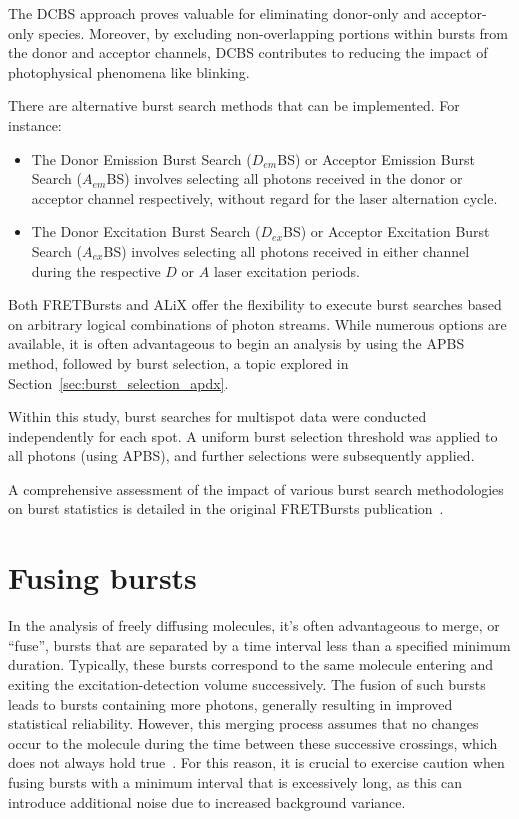 The \ac{DCBS} approach proves valuable for eliminating donor-only and acceptor-only species. 
Moreover, by excluding non-overlapping portions within bursts from the donor and acceptor channels, \ac{DCBS} contributes to reducing the impact of photophysical phenomena like blinking.

There are alternative burst search methods that can be implemented. 
For instance:

\begin{itemize}
    \item The Donor Emission Burst Search ($D_{em}$BS) or Acceptor Emission Burst Search ($A_{em}$BS) involves selecting all photons received in the donor or acceptor channel respectively, without regard for the laser alternation cycle.
    \item The Donor Excitation Burst Search ($D_{ex}$BS) or Acceptor Excitation Burst Search ($A_{ex}$BS) involves selecting all photons received in either channel during the respective $D$ or $A$ laser excitation periods.
\end{itemize}

Both FRETBursts and ALiX offer the flexibility to execute burst searches based on arbitrary logical combinations of photon streams. While numerous options are available, it is often advantageous to begin an analysis by using the \ac{APBS} method, followed by burst selection, a topic explored in Section~\ref{sec:burst_selection_apdx}.

Within this study, burst searches for multispot data were conducted independently for each spot. A uniform burst selection threshold was applied to all photons (using \ac{APBS}), and further selections were subsequently applied.

A comprehensive assessment of the impact of various burst search methodologies on burst statistics is detailed in the original FRETBursts publication~\cite{ingargiola_PLOS1_2016}.

\section{Fusing bursts}
\label{sec:fusing_bursts_apdx}

In the analysis of freely diffusing molecules, it's often advantageous to merge, or \enquote{fuse}, bursts that are separated by a time interval less than a specified minimum duration. 
Typically, these bursts correspond to the same molecule entering and exiting the excitation-detection volume successively. 
The fusion of such bursts leads to bursts containing more photons, generally resulting in improved statistical reliability. 
However, this merging process assumes that no changes occur to the molecule during the time between these successive crossings, which does not always hold true~\cite{hoffmann_PCCP_2011}.
For this reason, it is crucial to exercise caution when fusing bursts with a minimum interval that is excessively long, as this can introduce additional noise due to increased background variance.

